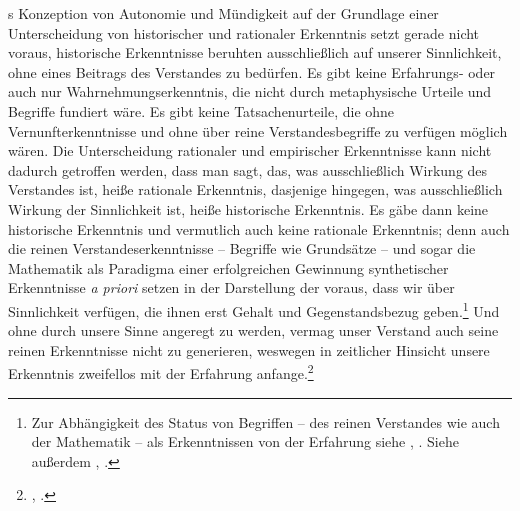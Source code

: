 \begin{nummerierung}
s Konzeption von Autonomie und Mündigkeit auf der Grundlage einer
Unterscheidung von historischer und rationaler Erkenntnis setzt gerade nicht
voraus, historische Erkenntnisse beruhten ausschließlich auf unserer
Sinnlichkeit, ohne eines Beitrags des Verstandes zu bedürfen. Es gibt keine
Erfahrungs- oder auch nur Wahrnehmungserkenntnis, die nicht durch metaphysische
Urteile und Begriffe fundiert wäre. Es gibt keine Tatsachenurteile, die ohne Vernunfterkenntnisse und
ohne über reine Verstandesbegriffe zu verfügen möglich wären. Die Unterscheidung
rationaler und empirischer Erkenntnisse kann nicht dadurch getroffen werden,
dass man sagt, das, was ausschließlich Wirkung des Verstandes ist, heiße
rationale Erkenntnis, dasjenige hingegen, was ausschließlich Wirkung der
Sinnlichkeit ist, heiße historische Erkenntnis. Es gäbe dann keine historische
Erkenntnis und vermutlich auch keine rationale Erkenntnis; denn auch die reinen
Verstandeserkenntnisse -- Begriffe wie Grundsätze -- und sogar die Mathematik
als Paradigma einer erfolgreichen Gewinnung synthetischer Erkenntnisse \emph{a
priori} setzen in der Darstellung der  voraus,
dass wir über Sinnlichkeit verfügen, die ihnen erst Gehalt und Gegenstandsbezug
geben.\footnote{Zur Abhängigkeit des Status von Begriffen -- des reinen
Verstandes wie auch der Mathematik -- als Erkenntnissen von der Erfahrung siehe
\cite[][B 147]{Kant:KritikderreinenVernunft2003},
\cite[][III: 117.17--26]{Kant:GesammelteWerke1900ff.}. Siehe außerdem \cite[][B
196]{Kant:KritikderreinenVernunft2003}, \cite[][III:
145.11--20]{Kant:GesammelteWerke1900ff.}.} Und ohne durch unsere Sinne angeregt
zu werden, vermag unser Verstand auch seine reinen Erkenntnisse nicht zu
generieren, weswegen in zeitlicher Hinsicht unsere Erkenntnis zweifellos mit der
Erfahrung anfange.\footnote{\cite[Vgl.][B 1]{Kant:KritikderreinenVernunft2003},
\cite[][III: 27.5--13]{Kant:GesammelteWerke1900ff.}.}



\end{nummerierung}
